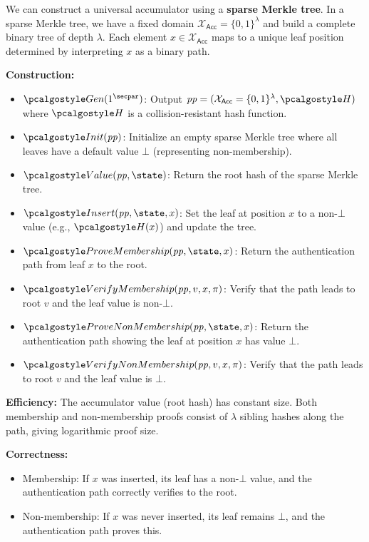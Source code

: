 \ifsolutions
\begin{mysolution}
  We can construct a universal accumulator using a \textbf{sparse Merkle tree}.
  In a sparse Merkle tree, we have a fixed domain $\mathcal{X}_\mathsf{Acc} = \{0,1\}^\lambda$ and build a complete binary tree of depth $\lambda$.
  Each element $x \in \mathcal{X}_\mathsf{Acc}$ maps to a unique leaf position determined by interpreting $x$ as a binary path.
  
  \textbf{Construction:}
  \begin{itemize}
    \item $\algo{Gen}(1^\secpar)$: Output $\params = (\mathcal{X}_\mathsf{Acc} = \{0,1\}^\lambda, \algo{H})$ where $\algo{H}$ is a collision-resistant hash function.
    \item $\algo{Init}(\params)$: Initialize an empty sparse Merkle tree where all leaves have a default value $\bot$ (representing non-membership).
    \item $\algo{Value}(\params, \state)$: Return the root hash of the sparse Merkle tree.
    \item $\algo{Insert}(\params, \state, x)$: Set the leaf at position $x$ to a non-$\bot$ value (e.g., $\algo{H}(x)$) and update the tree.
    \item $\algo{ProveMembership}(\params, \state, x)$: Return the authentication path from leaf $x$ to the root.
    \item $\algo{VerifyMembership}(\params, v, x, \pi)$: Verify that the path leads to root $v$ and the leaf value is non-$\bot$.
    \item $\algo{ProveNonMembership}(\params, \state, x)$: Return the authentication path showing the leaf at position $x$ has value $\bot$.
    \item $\algo{VerifyNonMembership}(\params, v, x, \pi)$: Verify that the path leads to root $v$ and the leaf value is $\bot$.
  \end{itemize}
  
  \textbf{Efficiency:} The accumulator value (root hash) has constant size.
  Both membership and non-membership proofs consist of $\lambda$ sibling hashes along the path, giving logarithmic proof size.
  
  \textbf{Correctness:} 
  \begin{itemize}
    \item Membership: If $x$ was inserted, its leaf has a non-$\bot$ value, and the authentication path correctly verifies to the root.
    \item Non-membership: If $x$ was never inserted, its leaf remains $\bot$, and the authentication path proves this.
  \end{itemize}
  

\end{mysolution}

